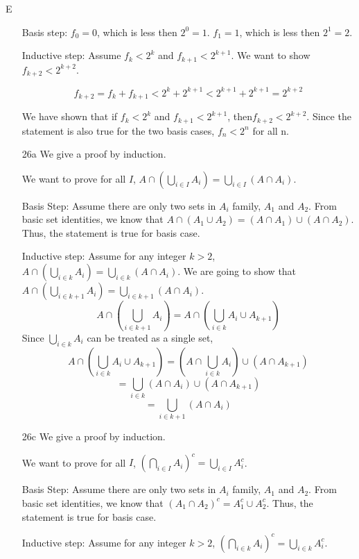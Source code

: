 E\documentclass[a4paper]{article}
\begin{document}
\begin{enumerate}
Basis step:
$f_{0}=0$, which is less then $2^0=1$. 
$f_{1}=1$, which is less then $2^1=2$. 


Inductive step:
Assume $f_{k}<2^k$ and $f_{k+1}<2^{k+1}$. We want to show $f_{k+2}<2^{k+2}$. 

$$f_{k+2}=f_{k}+f_{k+1}<2^k+2^{k+1}<2^{k+1}+2^{k+1}=2^{k+2}$$


We have shown that if $f_{k}<2^k$ and $f_{k+1}<2^{k+1}$, then$f_{k+2}<2^{k+2}$. Since the statement is also true for the two basis cases,  $f_{n}<2^n$ for all n.


\item[26a]
We give a proof by induction.


We want to prove for all $I$, $A \cap (\displaystyle \bigcup_{i\in I}  A_{i}) = \displaystyle \bigcup_{i\in I}(A \cap A_{i}) $.


Basis Step:
Assume there are only two sets in $A_{i}$ family, $A_{1}$ and $A_{2}$.
From basic set identities, we know that $A \cap (A_{1} \cup A_{2}) = (A \cap A_{1}) \cup (A \cap A_{2})$. Thus, the statement is true for basis case. 


Inductive step:
Assume for any integer $k>2$, $A \cap (\displaystyle \bigcup_{i\in k}  A_{i}) = \displaystyle \bigcup_{i\in k}(A \cap A_{i})$. We are going to show that $A \cap (\displaystyle \bigcup_{i\in k+1}  A_{i}) = \displaystyle \bigcup_{i\in k+1}(A \cap A_{i})$. 
$$A \cap (\displaystyle \bigcup_{i\in k+1}  A_{i}) = A \cap (\displaystyle \bigcup_{i\in k}  A_{i} \cup A_{k+1})$$
Since $\displaystyle \bigcup_{i\in k}  A_{i}$ can be treated as a single set, 
$$A \cap (\displaystyle \bigcup_{i\in k}  A_{i} \cup A_{k+1})=(A \cap \displaystyle \bigcup_{i\in k} A_{i}) \cup (A \cap A_{k+1})$$
$$=\displaystyle \bigcup_{i\in k}(A \cap A_{i}) \cup (A \cap A_{k+1})$$
$$=\displaystyle \bigcup_{i\in k+1}(A \cap A_{i})$$


\item[26c]
We give a proof by induction.


We want to prove for all $I$, $(\displaystyle \bigcap_{i\in I}  A_{i})^{c} = \displaystyle \bigcup_{i\in I} A_{i}^{c}$.


Basis Step:
Assume there are only two sets in $A_{i}$ family, $A_{1}$ and $A_{2}$.
From basic set identities, we know that $ (A_{1} \cap A_{2})^c = A_{1}^c \cup A_{2}^c$. Thus, the statement is true for basis case. 


Inductive step:
Assume for any integer $k>2$, $(\displaystyle \bigcap_{i\in k}  A_{i})^{c} = \displaystyle \bigcup_{i\in k} A_{i}^{c}$. 



\end{enumerate}
\end{document}
